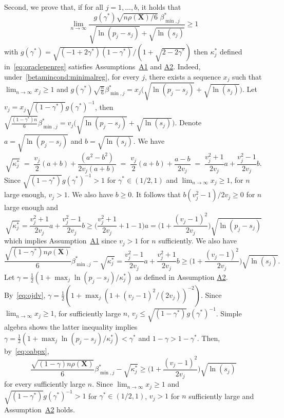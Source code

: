 \documentclass[
  12pt]{article}
\newcommand{\bX}{\mathbf{X}}
\begin{document}
Second, we prove that, if for all $j=1,\ldots,b$, it holds that
\begin{equation}\label{betamincond:minimalreg}
    \lim_{n\to \infty}\frac{g(\gamma^*)\sqrt{ n\rho(\bX)/6}\;\beta_{\min,j}^*}{\sqrt{\ln(p_j-s_j)} + \sqrt{\ln(s_j)}} \geq 1
\end{equation}
with $g(\gamma^*)=\sqrt{(-1 + 2 \gamma^*)(1-\gamma^*)}/(1 + \sqrt{2 - 2 \gamma^*})$ then $\kappa^*_j$ defined in~\eqref{eq:oraclepenreg} satisfies Assumptions~\hyperlink{lab:A1}{A1} and \hyperlink{lab:A2}{A2}. Indeed, under~\eqref{betamincond:minimalreg}, for every $j$, there exists a sequence $x_j$ such that $\lim_{n\to\infty} x_j\geq1$ and $g(\gamma^*)\sqrt{\frac{n}{6}}\beta^*_{\min,j}=x_j\big(\sqrt{\ln(p_j-s_j)} + \sqrt{\ln(s_j)}\big)$. Let $v_j= x_j \sqrt{(1-\gamma^*)}g(\gamma^*)^{-1}$, then $\sqrt{\frac{(1-\gamma^*)n}{6}}\beta^*_{\min,j}=v_j\big(\sqrt{\ln(p_j-s_j)} + \sqrt{\ln(s_j)}\big)$. Denote $a=\sqrt{\ln(p_j-s_j)}$ and $b=\sqrt{\ln(s_j)}$.
We have
$$
\sqrt{\kappa^*_j} \;=\;\frac{v_j}{2} (a+b)+\frac{(a^2-b^2)}{2v_j(a+b)}\;=\;\frac{v_j}{2} (a+b)+\frac{a-b}{2v_j}\;=\;\frac{v_j^2+1}{2v_j}a+\frac{v_j^2-1}{2v_j}b.
$$
Since $\sqrt{(1-\gamma^*)}g(\gamma^*)^{-1}>1$ for $\gamma^*\in(1/2,1)$ and $\lim_{n\to\infty} x_j\geq1$, for $n$ large enough, $v_j>1$. We also have $b\geq 0$. It follows that $b(v_j^2-1)/2v_j \geq 0$ for $n$ large enough and
\begin{equation}\label{eq:ojdv}
\sqrt{\kappa^*_j} =\frac{v_j^2+1}{2v_j}a+\frac{v_j^2-1}{2v_j}b  \geq  \Big(\frac{v_j^2+1}{2v_j}+1-1\Big)a = \Big(1+\frac{(v_j-1)^2}{2v_j}\Big)\sqrt{\ln(p_j-s_j)} 
\end{equation}
which implies Assumption~\hyperlink{lab:A1}{A1} since $v_j>1$ for $n$ sufficiently. We also have
\begin{equation}\label{eq:oabpx}
\frac{\sqrt{(1-\gamma^*) n\rho(\bX)}}{6}{\beta_{\min,j}^*}-\sqrt{\kappa^*_j} = \frac{v_j^2-1}{2v_j}a+\frac{v_j^2+1}{2v_j}b \geq \Big(1+\frac{(v_j-1)^2}{2v_j}\Big)\sqrt{\ln(s_j)}.
\end{equation}
Let $\gamma = \tfrac12(1+\max_j\ln(p_j-s_j)/\kappa^*_j)$ as defined in Assumption \hyperlink{lab:A2}{A2}. By~\eqref{eq:ojdv}, $\gamma = \tfrac12(1+\max_j(1+(v_j-1)^2/(2v_j))^{-2})$. Since $\lim_{n\to\infty} x_j\geq 1$, for sufficiently large $n$, $v_j\leq \sqrt{(1-\gamma^*)}g(\gamma^*)^{-1}$. Simple algebra shows the latter inequality implies $\gamma=\tfrac12(1+\max_j\ln(p_j-s_j)/\kappa^*_j) < \gamma^*$ and $1-\gamma > 1-\gamma^*$. Then, by~\eqref{eq:oabpx}, 
\begin{equation*}
\frac{\sqrt{(1-\gamma) n\rho(\bX)}}{6}{\beta_{\min,j}^*}-\sqrt{\kappa^*_j} \geq \Big(1+\frac{(v_j-1)^2}{2v_j}\Big)\sqrt{\ln(s_j)}
\end{equation*}
for every sufficiently large $n$. Since $\lim_{n\to\infty} x_j\geq1$ and $\sqrt{(1-\gamma^*)}g(\gamma^*)^{-1}>1$ for $\gamma^*\in(1/2,1)$, $v_j>1$ for $n$ sufficiently large and  Assumption~\hyperlink{lab:A2}{A2} holds.
\end{document}
